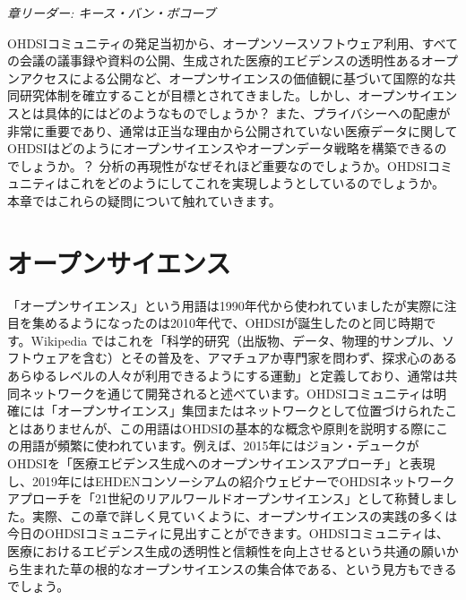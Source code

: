 \documentclass[
  11pt]{book}
\theoremstyle{definition}
\theoremstyle{definition}
\theoremstyle{definition}
\theoremstyle{definition}
\theoremstyle{remark}
\begin{document}

\emph{章リーダー: キース・バン・ボコーブ}

OHDSIコミュニティの発足当初から、オープンソースソフトウェア利用、すべての会議の議事録や資料の公開、生成された医療的エビデンスの透明性あるオープンアクセスによる公開など、オープンサイエンスの価値観に基づいて国際的な共同研究体制を確立することが目標とされてきました。しかし、オープンサイエンスとは具体的にはどのようなものでしょうか？ また、プライバシーへの配慮が非常に重要であり、通常は正当な理由から公開されていない医療データに関してOHDSIはどのようにオープンサイエンスやオープンデータ戦略を構築できるのでしょうか。？ 分析の再現性がなぜそれほど重要なのでしょうか。OHDSIコミュニティはこれをどのようにしてこれを実現しようとしているのでしょうか。 本章ではこれらの疑問について触れていきます。

\section{オープンサイエンス}\label{ux30aaux30fcux30d7ux30f3ux30b5ux30a4ux30a8ux30f3ux30b9}

「オープンサイエンス」という用語は1990年代から使われていましたが実際に注目を集めるようになったのは2010年代で、OHDSIが誕生したのと同じ時期です。Wikipedia \citep{wiki:Open_science} ではこれを「科学的研究（出版物、データ、物理的サンプル、ソフトウェアを含む）とその普及を、アマチュアか専門家を問わず、探求心のあるあらゆるレベルの人々が利用できるようにする運動」と定義しており、通常は共同ネットワークを通じて開発されると述べています。OHDSIコミュニティは明確には「オープンサイエンス」集団またはネットワークとして位置づけられたことはありませんが、この用語はOHDSIの基本的な概念や原則を説明する際にこの用語が頻繁に使われています。例えば、2015年にはジョン・デュークがOHDSIを「医療エビデンス生成へのオープンサイエンスアプローチ」と表現し、2019年にはEHDENコンソーシアムの紹介ウェビナーでOHDSIネットワークアプローチを「21世紀のリアルワールドオープンサイエンス」として称賛しました。実際、この章で詳しく見ていくように、オープンサイエンスの実践の多くは今日のOHDSIコミュニティに見出すことができます。OHDSIコミュニティは、医療におけるエビデンス生成の透明性と信頼性を向上させるという共通の願いから生まれた草の根的なオープンサイエンスの集合体である、という見方もできるでしょう。
\end{document}
